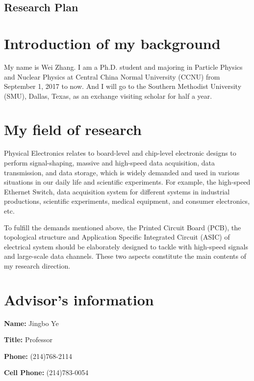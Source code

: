 \documentclass[11pt,a4paper]{article}
\begin{document}
\begin{spacing}{1.2}           %

\begin{center}
\section*{\huge Research Plan}
\end{center}

\section*{Introduction of my background}    %
My name is Wei Zhang. I am a Ph.D. student and majoring in Particle Physics and Nuclear Physics at Central China Normal University (CCNU) from September 1, 2017 to now. And I will go to the Southern Methodist University (SMU), Dallas, Texas, as an exchange visiting scholar for half a year.
\section*{My field of research}    %
Physical Electronics relates to board-level and chip-level electronic designs to perform signal-shaping, massive and high-speed data acquisition, data transmission, and data storage, which is widely demanded and used in various situations in our daily life and scientific experiments. For example, the high-speed Ethernet Switch, data acquisition system for different systems in industrial productions, scientific experiments, medical equipment, and consumer electronics, etc.

To fulfill the demands mentioned above, the Printed Circuit Board (PCB), the topological structure and Application Specific Integrated Circuit (ASIC) of electrical system should be elaborately designed to tackle with high-speed signals and large-scale data channels. These two aspects constitute the main contents of my research direction.

\section*{Advisor's information}     %
\begin{multicols}{2}
\textbf{Name:} Jingbo Ye   

\textbf{Title:} Professor 

\textbf{Phone:} (214)768-2114

\textbf{Cell Phone:} (214)783-0054


\end{multicols}
\end{spacing}
\end{document}
